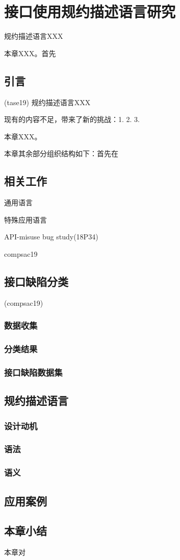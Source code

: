 \chapter{接口使用规约描述语言研究}
\label{cha:impsec}
规约描述语言XXX

本章XXX。首先

\section{引言}
(tase19)
规约描述语言XXX

现有的内容不足，带来了新的挑战：1. 2. 3.

本章XXX。

本章其余部分组织结构如下：首先在

\section{相关工作}
通用语言

特殊应用语言

API-misuse bug study(18P34)

compsac19

\section{接口缺陷分类}
(compsac19)
\subsection{数据收集}
\subsection{分类结果}
\subsection{接口缺陷数据集}

\section{规约描述语言}
\subsection{设计动机}
\subsection{语法}
\subsection{语义}

\section{应用案例}

\section{本章小结}
本章对